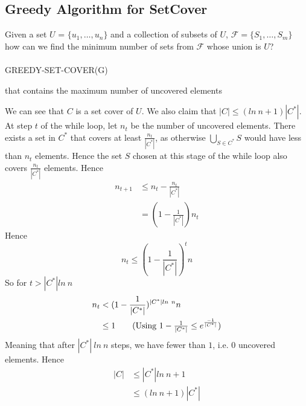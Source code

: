\documentclass{article}
\theoremstyle{plain}
\theoremstyle{definition}
\begin{document}
    \subsection{Greedy Algorithm for SetCover}
    Given a set $U$ = $\{ u_1, \ldots, u_n \}$ and a collection of subsets of $U$, $\mathcal{F} = \{ S_1, \ldots, S_m \}$ how can we find the minimum number of sets from $\mathcal{F}$ whose union is $U$? \\ \\
    GREEDY-SET-COVER(G)
    \begin{algorithmic}
             that contains the maximum number of uncovered elements
        \EndWhile
    \end{algorithmic}
    We can see that $C$ is a set cover of $U$. We also claim that $|C| \leq (ln \ n + 1)|C^*|$. At step $t$ of the while loop, let $n_t$ be the number of uncovered elements. There exists a set in $C^*$ that covers at least $\frac{n_t}{|C^*|}$, as otherwise $\bigcup_{S \in C^*} S$ would have less than $n_t$ elements. Hence the set $S$ chosen at this stage of the while loop also covers $\frac{n_t}{|C^*|}$ elements. Hence
    \begin{align*}
        n_{t+1} &\leq n_t - \frac{n_t}{|C^*|} \\ 
                &= (1 - \frac{1}{|C^*|})n_t
    \end{align*} 
    Hence 
    \[ n_t \leq (1 - \frac{1}{|C^*|})^t n \]
    So for $t > |C^*| ln \ n$
    \begin{align*}
        n_t &< (1 - \frac{1}{|C^*|})^{|C^*| ln \ n} n \\ 
            &\leq 1 \tag{Using $1 - \frac{1}{|C^*|} \leq e^{\frac{-1}{|C^*|}}$}
    \end{align*}
    Meaning that after $|C^*| \ ln \ n$ steps, we have fewer than $1$, i.e. $0$ uncovered elements. Hence 
    \begin{align*}
        |C| &\leq |C^*| ln \ n + 1 \\
            &\leq (ln \ n + 1) |C^*|
    \end{align*} 
\end{document}
